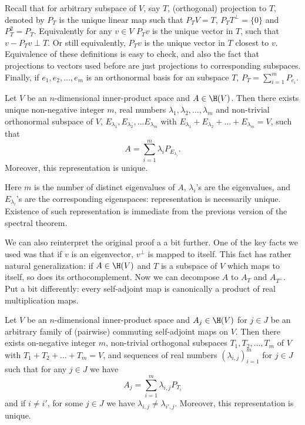 Recall that for arbitrary subspace of $V$, say $T$, (orthogonal) projection to $T$, denoted by $P_{T}$ is the unique linear map such that $P_{T} V = T$, $P_{T} T^{\perp} = \{0\}$ and $P_{T}^2 = P_{T}$. Equivalently for any $v \in V$ $P_{T}v$ is the unique vector in $T$, such that $v - P_{T} v \perp T$. Or still equivalently, $P_{T} v$ is the unique vector in $T$ closest to $v$. Equivalence of these definitions is easy to check, and also the fact that projections to vectors used before are just projections to corresponding subspaces. Finally, if $e_{1}, e_{2}, \ldots, e_{m}$ is an orthonormal basis for an subspace $T$, $P_{T} = \sum_{i = 1}^{m} P_{e_{i}}$.

\begin{lause}
	Let $V$ be an $n$-dimensional inner-product space and $A \in \H(V)$. Then there exists unique non-negative integer $m$, real numbers $\lambda_{1}, \lambda_{2}, \ldots, \lambda_{m}$ and non-trivial orthonormal subspace of $V$, $E_{\lambda_{1}}, E_{\lambda_{2}}, \ldots E_{\lambda_{m}}$ with $E_{\lambda_{1}} + E_{\lambda_{2}} + \ldots + E_{\lambda_{m}} = V$, such that
	\[
		A = \sum_{i = 1}^{m} \lambda_{i} P_{E_{\lambda_{i}}}.
	\]
	Moreover, this representation is unique.
\end{lause}

Here $m$ is the number of distinct eigenvalues of $A$, $\lambda_{i}$'s are the eigenvalues, and $E_{\lambda_{i}}$'s are the corresponding eigenspaces: representation is necessarily unique. Existence of such representation is immediate from the previous version of the spectral theorem.

We can also reinterpret the original proof a a bit further. One of the key facts we used was that if $v$ is an eigenvector, $v^{\perp}$ is mapped to itself. This fact has rather natural generalization: if $A \in \H(V)$ and $T$ is a subspace of $V$ which maps to itself, so does its orthocomplement. Now we can decompose $A$ to $A_{T}$ and $A_{T^{\perp}}$. Put a bit differently: every self-adjoint map is canonically a product of real multiplication maps.

\begin{lause}
	Let $V$ be an $n$-dimensional inner-product space and $A_{j} \in \H(V)$ for $j \in J$ be an arbitrary family of (pairwise) commuting self-adjoint maps on $V$. Then there exists on-negative integer $m$, non-trivial orthogonal subspaces $T_{1}, T_{2}, \ldots, T_{m}$ of $V$ with $T_{1} + T_{2} + \ldots + T_{m} = V$, and sequences of real numbers $(\lambda_{i, j})_{i = 1}^{m}$ for $j \in J$ such that for any $j \in J$ we have
	\[
		A_{j} = \sum_{i = 1}^{m} \lambda_{i, j} P_{T_{i}}
	\]
	and if $i \neq i'$, for some $j \in J$ we have $\lambda_{i, j} \neq \lambda_{i', j}$. Moreover, this representation is unique.
\end{lause}

